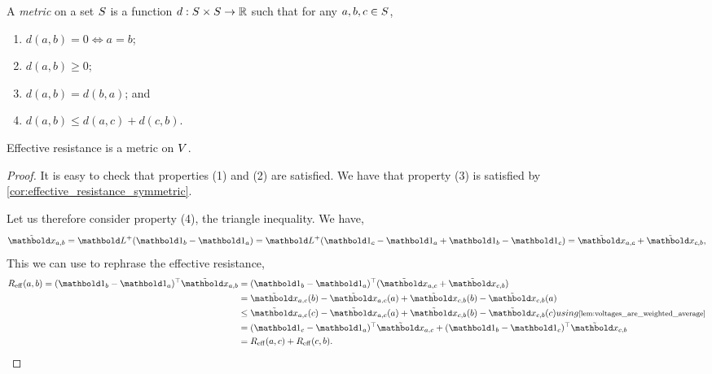 \begin{defn}[Metric] A \emph{metric} on a set $S$ is a function $d : S \times S \to \mathbb{R}$ such that for any $a, b, c \in S$, \begin{enumerate}
    \item $d(a,b) = 0 \iff a = b$;
    \item $d(a,b) \geq 0$;
    \item $d(a,b) = d(b,a)$; and
    \item $d(a,b) \leq d(a,c) + d(c,b)$.
\end{enumerate}
\end{defn}
\begin{lem}
Effective resistance is a metric on $V$.
\end{lem}
\begin{proof} It is easy to check that properties (1) and (2) are satisfied. We have that property (3) is satisfied by \cref{cor:effective_resistance_symmetric}.

Let us therefore consider property (4), the triangle inequality. We have, \begin{align*}
    \ex_{a,b} = \pinv{\mL}(\vOne_b - \vOne_a) = \pinv{\mL}(\vOne_c - \vOne_a + \vOne_b - \vOne_c) = \ex_{a,c} + \ex_{c,b},
\end{align*} This we can use to rephrase the effective resistance, \begin{align*}
    \Reff(a,b) = \trans{(\vOne_b - \vOne_a)}\ex_{a,b} &= \trans{(\vOne_b - \vOne_a)}(\ex_{a,c} + \ex_{c,b}) \\
    &= \ex_{a,c}(b) - \ex_{a,c}(a) + \ex_{c,b}(b) - \ex_{c,b}(a) \\
    &\leq \ex_{a,c}(c) - \ex_{a,c}(a) + \ex_{c,b}(b) - \ex_{c,b}(c) \margintag{using \cref{lem:voltages_are_weighted_average}} \\
    &= \trans{(\vOne_c - \vOne_a)}\ex_{a,c} + \trans{(\vOne_b - \vOne_c)}\ex_{c,b} \\
    &= \Reff(a,c) + \Reff(c,b). \qedhere
\end{align*}
\end{proof}
